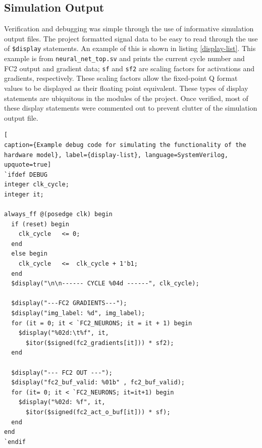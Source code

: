 \subsection{Simulation Output}
Verification and debugging was simple through the use of informative simulation output files. The project formatted signal data to be easy to read through the use of \texttt{\$display} statements. An example of this is shown in listing \ref{display-list}. This example is from \texttt{neural\_net\_top.sv} and prints the current cycle number and FC2 output and gradient data; \texttt{sf} and \texttt{sf2} are scaling factors for activations and gradients, respectively. These scaling factors allow the fixed-point Q format values to be displayed as their floating point equivalent. These types of display statements are ubiquitous in the modules of the project. Once verified, most of these display statements were commented out to prevent clutter of the simulation output file.
\begin{lstlisting}[
caption={Example debug code for simulating the functionality of the hardware model}, label={display-list}, language=SystemVerilog, upquote=true]
`ifdef DEBUG
integer clk_cycle;
integer it;

always_ff @(posedge clk) begin
  if (reset) begin
    clk_cycle   <= 0;
  end
  else begin
    clk_cycle   <=  clk_cycle + 1'b1;
  end
  $display("\n\n------ CYCLE %04d ------", clk_cycle);
  	
  $display("---FC2 GRADIENTS---");    
  $display("img_label: %d", img_label);    
  for (it = 0; it < `FC2_NEURONS; it = it + 1) begin
    $display("%02d:\t%f", it, 
      $itor($signed(fc2_gradients[it])) * sf2);
  end
  
  $display("--- FC2 OUT ---");        
  $display("fc2_buf_valid: %01b" , fc2_buf_valid);
  for (it= 0; it < `FC2_NEURONS; it=it+1) begin
    $display("%02d: %f", it, 
      $itor($signed(fc2_act_o_buf[it])) * sf); 
  end
end 
`endif    
\end{lstlisting}

